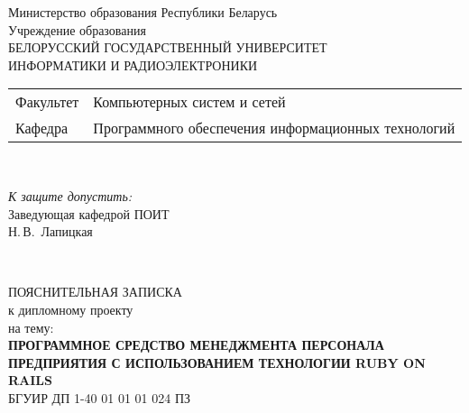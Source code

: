 \begin{titlepage}
  \begin{center}
    Министерство образования Республики Беларусь\\[1em]
    Учреждение образования\\
    БЕЛОРУССКИЙ ГОСУДАРСТВЕННЫЙ УНИВЕРСИТЕТ \\
    ИНФОРМАТИКИ И РАДИОЭЛЕКТРОНИКИ\\[1em]

    \begin{minipage}{\textwidth}
      \begin{flushleft}
        \begin{tabular}{ l l }
          Факультет & Компьютерных систем и сетей\\
          Кафедра   & Программного обеспечения информационных технологий
        \end{tabular}
      \end{flushleft}
    \end{minipage}\\[1em]

    \begin{flushright}
      \begin{minipage}{0.4\textwidth}
        \textit{К защите допустить:}\\[0.8em]
        Заведующая кафедрой ПОИТ\\[0.45em]
        \underline{\hspace*{2.8cm}} Н.\,В.~Лапицкая
      \end{minipage}\\[2.2em]
    \end{flushright}

    {ПОЯСНИТЕЛЬНАЯ ЗАПИСКА}\\
    {к дипломному проекту}\\
    {на тему:}\\[1em]
    \textbf{\large \MakeUppercase{Программное средство менеджмента персонала предприятия с использованием технологии Ruby on Rails}}\\[1em]


    {БГУИР ДП 1-40 01 01 01 024 ПЗ}\\[2em]
    

\end{center}
\end{titlepage}
